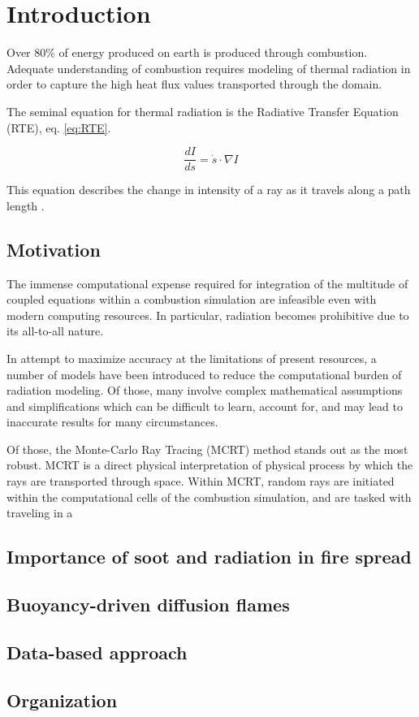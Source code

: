 \addchapheadtotoc

\chapter{Introduction}
Over 80\% of energy produced on earth is produced through combustion. Adequate understanding of combustion requires modeling of thermal radiation in order to capture the high heat flux values transported through the domain.

The seminal equation for thermal radiation is the Radiative Transfer Equation (RTE), eq. \ref{eq:RTE}.

\begin{equation}
    \frac{dI}{ds} = \dot{s} \cdot \nabla{I}
    \label{eq:RTE}
\end{equation}

This equation describes the change in intensity of a ray as it travels along a path length \cite{Modest2013RadiativeTransfer}.

\section{Motivation}
The immense computational expense required for integration of the multitude of coupled equations within a combustion simulation are infeasible even with modern computing resources. In particular, radiation becomes prohibitive due to its all-to-all nature. 

In attempt to maximize accuracy at the limitations of present resources, a number of models have been introduced to reduce the computational burden of radiation modeling. 
Of those, many involve complex mathematical assumptions and simplifications which can be difficult to learn, account for, and may lead to inaccurate results for many circumstances. 


Of those, the Monte-Carlo Ray Tracing (MCRT) method stands out as the most robust. 
MCRT is a direct physical interpretation of physical process by which the rays are transported through space.
Within MCRT, random rays are initiated within the computational cells of the combustion simulation, and are tasked with traveling in a 

\section{Importance of soot and radiation in fire spread}
 

\section{Buoyancy-driven diffusion flames}
\section{Data-based approach}

\section{Organization}
